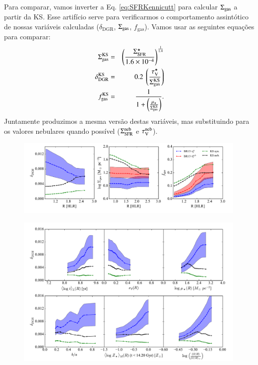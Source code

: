Para comparar, vamos inverter a Eq. \ref{eq:SFRKennicutt} para calcular $\SigmaGas$ a partir da KS.
Esse artifício serve para verificarmos o comportamento assintótico de nossas variáveis calculadas
($\delta_{\mathrm{DGR}}$, $\SigmaGas$, $f_{\mathrm{gas}}$). Vamos usar as seguintes equações para
comparar:
\begin{eqnarray}
	\SigmaGas^{\mathrm{KS}} &=& \left(\frac{\SigmaSFR}{1.6 \times 10^{-4}}\right)^{\frac{1}{1.4}} \\
	\label{eq:SigmaGasKenn}
	\delta_{\mathrm{DGR}}^{\mathrm{KS}} &=& 0.2\ \left(\frac{\tauVS}{\SigmaGas^{\mathrm{KS}}}\right) \\
	\label{eq:DeltaDGRKenn}
	f_{\mathrm{gas}}^{\mathrm{KS}} &=& \frac{1}{1 +
	\left(\frac{\mu_\star}{\SigmaGas^{\mathrm{KS}}}\right)}.
	\label{eq:fGasKenn}
\end{eqnarray}
\noindent Juntamente produzimos a mesma versão destas variáveis, mas substituindo para os valores
nebulares quando possível ($\Sigma_{\mathrm{SFR}}^{\mathrm{neb}}$ e $\tau_{\mathrm{V}}^{\mathrm{neb}}$). 
\begin{figure}
	\centering
	\includegraphics[width=0.99\textwidth]{figuras/gas_R.pdf}
	\caption[Perfis radiais de $\delta_{\mathrm{DGR}}$, $\SigmaGas$ e $f_{\mathrm{gas}}$.]
	{}
	\label{fig:propsDGR}
\end{figure}
\begin{figure}
	\centering
	\includegraphics[width=0.99\textwidth]{figuras/props_DGR.pdf}
	\caption[Propriedades versos $\delta_{\mathrm{DGR}}$.]
	{}
	\label{fig:propsDGR}
\end{figure}

